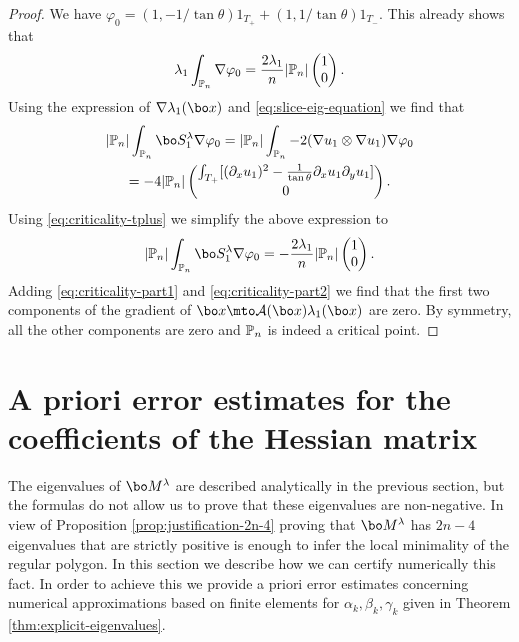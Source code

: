 \begin{proof}
We have $\varphi_0 = (1,-1/\tan\theta)1_{T_+}+(1,1/\tan\theta)1_{T_-}$. This already shows that
\begin{equation}\lambda_1 \int_{\Bbb P_n} \nabla \varphi_0 = \frac{2\lambda_1}{n} |\Bbb P_n| \begin{pmatrix}
1\\ 0
\end{pmatrix}.
\label{eq:criticality-part1}
\end{equation}
Using the expression of $\nabla \lambda_1(\bo x)$ and \eqref{eq:slice-eig-equation} we find that
\vspace*{-5pt}
\begin{multline*}
|\Bbb P_n| \int_{\Bbb P_n} \bo S_1^\lambda \nabla \varphi_0 = |\Bbb P_n| \int_{\Bbb P_n} -2(\nabla u_1\otimes \nabla u_1)\nabla \varphi_0 \\
= -4|\Bbb P_n| \begin{pmatrix}
\int_{T_+} [(\partial_x u_1)^2-\frac{1}{\tan \theta} \partial_x u_1 \partial_y u_1]\\
0
\end{pmatrix}.
\end{multline*}
Using \eqref{eq:criticality-tplus} we simplify the above expression to
\begin{equation} |\Bbb P_n| \int_{\Bbb P_n} \bo S_1^\lambda \nabla \varphi_0 = -\frac{2\lambda_1}{n}|\Bbb P_n| \begin{pmatrix} 1\\ 0
\end{pmatrix}.
\label{eq:criticality-part2}
\end{equation}
Adding \eqref{eq:criticality-part1} and \eqref{eq:criticality-part2} we find that the first two components of the gradient of $\bo x \mto \mathcal A(\bo x)\lambda_1(\bo x)$ are zero. By symmetry, all the other components are zero and $\Bbb P_n$ is indeed a critical point.
\end{proof}

\section{A priori error estimates for the coefficients of the Hessian matrix}\label{bobu200.s5}

The eigenvalues of $\bo M^\lambda$ are described analytically in the previous section, but the formulas do not allow us to prove that these eigenvalues are non-negative. In view of Proposition \ref{prop:justification-2n-4} proving that $\bo M^\lambda$ has $2n-4$ eigenvalues that are strictly positive is enough to infer the local minimality of the regular polygon. In this section we describe how we can certify numerically this fact. In order to achieve this we provide a priori error estimates concerning numerical approximations based on finite elements for $\alpha_k,\beta_k,\gamma_k$ given in Theorem \ref{thm:explicit-eigenvalues}.

